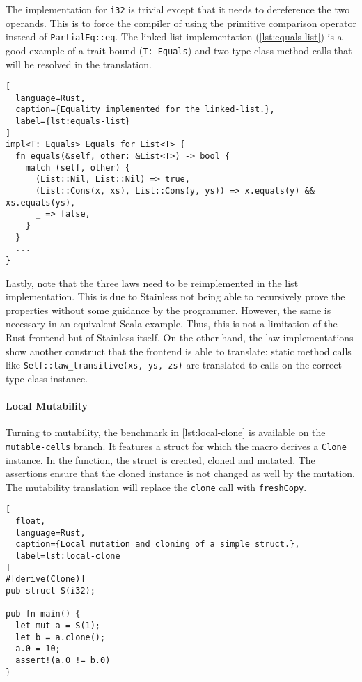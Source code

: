 The implementation for \lstinline!i32! is trivial except that it needs to
dereference the two operands. This is to force the compiler of using the
primitive comparison operator instead of  \lstinline!PartialEq::eq!. The
linked-list implementation (\autoref{lst:equals-list}) is a good example of a
trait bound (\lstinline!T: Equals!) and two type class method calls that will be
resolved in the translation.

\begin{lstlisting}[
  language=Rust,
  caption={Equality implemented for the linked-list.},
  label={lst:equals-list}
]
impl<T: Equals> Equals for List<T> {
  fn equals(&self, other: &List<T>) -> bool {
    match (self, other) {
      (List::Nil, List::Nil) => true,
      (List::Cons(x, xs), List::Cons(y, ys)) => x.equals(y) && xs.equals(ys),
      _ => false,
    }
  }
  ...
}
\end{lstlisting}

Lastly, note that the three laws need to be reimplemented in the list
implementation. This is due to Stainless not being able to recursively prove the
properties without some guidance by the programmer. However, the same is
necessary in an equivalent Scala example. Thus, this is not a limitation of the
Rust frontend but of Stainless itself. On the other hand, the law
implementations show another construct that the frontend is able to translate:
static method calls like \lstinline!Self::law_transitive(xs, ys, zs)! are
translated to calls on the correct type class instance.

\paragraph{Local Mutability}

Turning to mutability, the benchmark in \autoref{lst:local-clone} is available
on the \texttt{mutable-cells} branch. It features a struct for which the macro
derives a \lstinline!Clone! instance. In the function, the struct is created,
cloned and mutated. The assertions ensure that the cloned instance is not
changed as well by the mutation. The mutability translation  will replace the
\lstinline!clone! call with \lstinline!freshCopy!.

\begin{lstlisting}[
  float,
  language=Rust,
  caption={Local mutation and cloning of a simple struct.},
  label=lst:local-clone
]
#[derive(Clone)]
pub struct S(i32);

pub fn main() {
  let mut a = S(1);
  let b = a.clone();
  a.0 = 10;
  assert!(a.0 != b.0)
}
\end{lstlisting}


